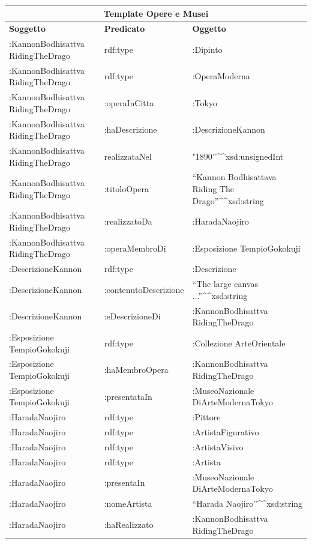 \documentclass[12pt]{article}
\begin{document}
\begin{center}
 \begin{tabular}{ |p{3cm}|p{3cm}|p{3cm}| }
 \hline
 \multicolumn{3}{|c|}{\textbf{Template Opere e Musei}} \\
 \hline
 \textbf{Soggetto} & \textbf{Predicato} & \textbf{Oggetto}\\
 \hline
 :KannonBodhisattva RidingTheDrago & rdf:type & :Dipinto   \\
 \hline
 :KannonBodhisattva RidingTheDrago &   rdf:type  & :OperaModerna\\
  \hline
 :KannonBodhisattva RidingTheDrago & :operaInCitta & :Tokyo\\
  \hline
 :KannonBodhisattva RidingTheDrago &:haDescrizione & :DescrizioneKannon\\
  \hline
 :KannonBodhisattva RidingTheDrago & realizzataNel & "1890”\textasciicircum \textasciicircum xsd:unsignedInt\\
 \hline
 :KannonBodhisattva RidingTheDrago & :titoloOpera  & “Kannon Bodhisattava Riding The Drago”\textasciicircum \textasciicircum xsd:string  \\
 \hline
 :KannonBodhisattva RidingTheDrago & :realizzatoDa  & :HaradaNaojiro\\
 \hline
 :KannonBodhisattva RidingTheDrago & :operaMembroDi  & :Esposizione TempioGokokuji   \\
 \hline
 :DescrizioneKannon & rdf:type  & :Descrizione\\
 \hline
 :DescrizioneKannon & :contenutoDescrizione  & “The large canvas ...”\textasciicircum \textasciicircum xsd:string   \\
 \hline
 :DescrizioneKannon & :eDescrizioneDi  & :KannonBodhisattva RidingTheDrago\\
 \hline
 :Esposizione TempioGokokuji & rdf:type  & :Collezione ArteOrientale\\
 \hline
 :Esposizione TempioGokokuji & :haMembroOpera  & :KannonBodhisattva RidingTheDrago\\
 \hline
 :Esposizione TempioGokokuji & :presentataIn  & :MuseoNazionale DiArteModernaTokyo   \\
 \hline
 :HaradaNaojiro & rdf:type  & :Pittore\\
 \hline
 :HaradaNaojiro & rdf:type  & :ArtistaFigurativo   \\
 \hline
 :HaradaNaojiro & rdf:type  & :ArtistaVisivo\\
 \hline
 :HaradaNaojiro & rdf:type  & :Artista\\
 \hline
 :HaradaNaojiro & :presentaIn  & :MuseoNazionale DiArteModernaTokyo\\
 \hline
  :HaradaNaojiro & :nomeArtista  & “Harada Naojiro”\textasciicircum \textasciicircum xsd:string\\
  \hline
 :HaradaNaojiro & :haRealizzato  & :KannonBodhisattva RidingTheDrago\\
 \hline
\end{tabular}
\end{center}
\newpage
\end{document}
